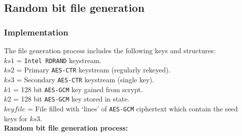 \documentclass{paper}
\begin{document}
			\subsection{Random bit file generation}
				\subsubsection{Implementation}
					The file generation process includes the following keys and structures:\\
					$\mathit{ks1}$ = \texttt{Intel RDRAND} keystream.\\
					$\mathit{ks2}$ = Primary \texttt{AES-CTR} keystream (regularly rekeyed).\\
					$\mathit{ks3}$ = Secondary \texttt{AES-CTR} keystream (single key).\\
					$\mathit{k1}$ = 128 bit \texttt{AES-GCM} key gained from scrypt.\\
					$\mathit{k2}$ = 128 bit \texttt{AES-GCM} key stored in state.\\
					$\mathit{keyfile}$ = File filled with `lines' of \texttt{AES-GCM} ciphertext which contain the seed keys for $\mathit{ks3}$.\vspace{1em}\\
					\textbf{Random bit file generation process:}
					\vspace{-0.75em}
\end{document}

